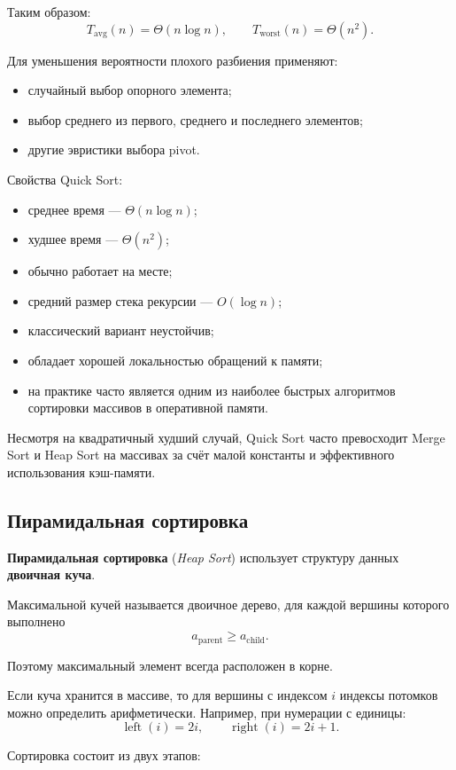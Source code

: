 Таким образом:
\[
T_{\text{avg}}(n)=\Theta(n\log n),
\qquad
T_{\text{worst}}(n)=\Theta(n^2).
\]

Для уменьшения вероятности плохого разбиения применяют:
\begin{itemize}
	\item случайный выбор опорного элемента;
	\item выбор среднего из первого, среднего и последнего элементов;
	\item другие эвристики выбора pivot.
\end{itemize}

Свойства Quick Sort:
\begin{itemize}
	\item среднее время --- $\Theta(n\log n)$;
	\item худшее время --- $\Theta(n^2)$;
	\item обычно работает на месте;
	\item средний размер стека рекурсии --- $O(\log n)$;
	\item классический вариант неустойчив;
	\item обладает хорошей локальностью обращений к памяти;
	\item на практике часто является одним из наиболее быстрых алгоритмов
	сортировки массивов в оперативной памяти.
\end{itemize}

Несмотря на квадратичный худший случай, Quick Sort часто превосходит
Merge Sort и Heap Sort на массивах за счёт малой константы и эффективного
использования кэш-памяти.


\subsection{Пирамидальная сортировка}

\textbf{Пирамидальная сортировка} (\textit{Heap Sort}) использует структуру
данных \textbf{двоичная куча}.

Максимальной кучей называется двоичное дерево, для каждой вершины которого
выполнено
\[
a_{\text{parent}} \geq a_{\text{child}}.
\]

Поэтому максимальный элемент всегда расположен в корне.

Если куча хранится в массиве, то для вершины с индексом $i$ индексы потомков
можно определить арифметически. Например, при нумерации с единицы:
\[
\operatorname{left}(i)=2i,
\qquad
\operatorname{right}(i)=2i+1.
\]

Сортировка состоит из двух этапов:

